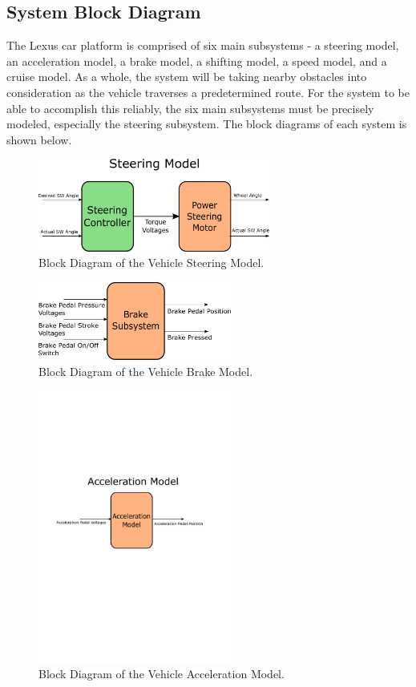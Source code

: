 \documentclass[12pt]{article} %
\begin{document}
\subsection{System Block Diagram}
The Lexus car platform is comprised of six main subsystems - a steering model,
an acceleration model, a brake model, a shifting model, a speed model, and a
cruise model. As a whole, the system will be taking nearby obstacles into consideration as the vehicle traverses a predetermined route. For the
system to be able to accomplish this reliably, the six main subsystems must be
precisely modeled, especially the steering subsystem. The block diagrams of each system is shown below.
%
\begin{figure}
    \centering
    \captionsetup{justification=centering, margin=3cm}
    \includegraphics[width=3in]{figs/inkscape/steeringModelArchitecture}
    \caption{Block Diagram of the Vehicle Steering Model.}
    \label{fig:steerBlockDiag}
\end{figure}
%
\begin{figure}
    \centering
    \captionsetup{justification=centering, margin=3cm}
    \includegraphics[width=2.5in]{figs/inkscape/brakeModelArchitecture}
    \caption{Block Diagram of the Vehicle Brake Model.}
    \label{fig:brakeBlockDiag}
\end{figure}
%
\begin{figure}
    \centering
    \captionsetup{justification=centering, margin=3cm}
    \includegraphics[width=2.5in]{figs/inkscape/accelerationModelArchitecture}
    \caption{Block Diagram of the Vehicle Acceleration Model.}
    \label{fig:accelBlockDiag}
\end{figure}
\end{document}
